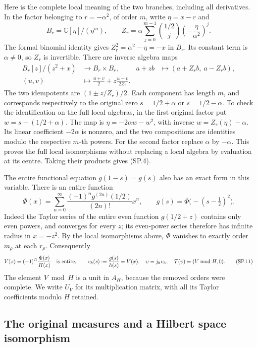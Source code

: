 Here is the complete local meaning of the two branches, including
all derivatives. In the factor belonging to \(r=-\alpha^2\), of
order \(m\), write \(\eta=x-r\) and
\[
 B_r=\mathbb C[\eta]/(\eta^m),\qquad
 Z_r=\alpha\sum_{j=0}^{m-1}\binom{1/2}{j}
                         \left(-\frac{\eta}{\alpha^2}\right)^j.
 \tag{SP.8}
\]
The formal binomial identity gives \(Z_r^2=\alpha^2-\eta=-x\)
in \(B_r\). Its constant term is \(\alpha\ne0\), so \(Z_r\)
is invertible. There are inverse algebra maps
\[
 \begin{aligned}
 B_r[z]/(z^2+x)&\longrightarrow B_r\times B_r,
       &a+zb&\longmapsto(a+Z_rb,\ a-Z_rb),\\
 (u,v)&\longmapsto \frac{u+v}{2}
                     +z\frac{u-v}{2Z_r}.
 \end{aligned}
 \tag{SP.9}
\]
The two idempotents are \((1\pm z/Z_r)/2\). Each component has
length \(m\), and corresponds respectively to the original zero
\(s=1/2+\alpha\) or \(s=1/2-\alpha\). To check the identification
on the full local algebras, in the first original factor put
\(w=s-(1/2+\alpha)\). The map is
\(\eta=-2\alpha w-w^2\), with inverse \(w=Z_r(\eta)-\alpha\).
Its linear coefficient \(-2\alpha\) is nonzero, and the two
compositions are identities modulo the respective \(m\)-th powers.
For the second factor replace \(\alpha\) by \(-\alpha\). This
proves the full local isomorphisms without replacing a local algebra
by evaluation at its centre. Taking their products gives (SP.4).

The entire functional equation \(g(1-s)=g(s)\) also has an exact
form in this variable. There is an entire function
\[
 \Phi(x)=\sum_{n=0}^{\infty}
       \frac{(-1)^n g^{(2n)}(1/2)}{(2n)!}x^n,
 \qquad g(s)=\Phi\bigl(-(s-\tfrac12)^2\bigr).
 \tag{SP.10}
\]
Indeed the Taylor series of the entire even function \(g(1/2+z)\)
contains only even powers, and converges for every \(z\); its
even-power series therefore has infinite radius in \(x=-z^2\).
By the local isomorphisms above, \(\Phi\) vanishes to exactly order
\(m_\rho\) at each \(r_\rho\). Consequently
\[
 V(x)=(-1)^D\frac{\Phi(x)}{H(x)}
 \quad\hbox{is entire},\qquad
 v_h(s):=\frac{g(s)}{h(s)}=V(x),
 \quad \upsilon=j_hv_h,\quad \mathcal T(\upsilon)=(V\bmod H,0).
 \tag{SP.11}
\]
The element \(V\bmod H\) is a unit in \(A_H\), because the removed
orders were complete. We write \(U_V\) for its multiplication
matrix, with all its Taylor coefficients modulo \(H\) retained.

\subsection{The original measures and a Hilbert space isomorphism}

